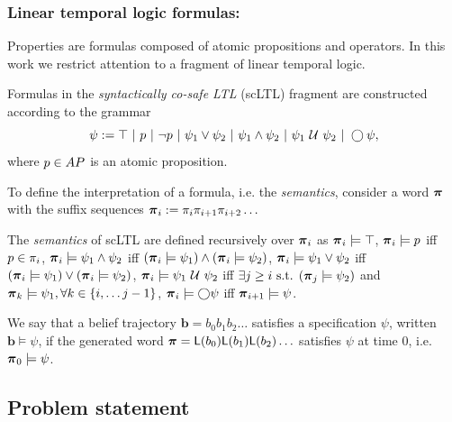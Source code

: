 \documentclass{ifacconf}
\begin{document}
\subsubsection{Linear temporal logic formulas:}

Properties are formulas composed of atomic propositions and operators. In this work we restrict attention to a fragment of linear temporal logic.
\begin{definition}
  \label{def:gdtl-syntax}
  Formulas in the \emph{syntactically co-safe LTL} (scLTL) fragment are constructed according to the grammar
  \begin{equation*}
    \label{eq:scLTL}
    \psi :=  \True \ |\ p \ |\ \notltl p \ |\ \psi_1 \vee\psi_2  \ |\ \psi_1 \andltl \psi_2 \ |\ \psi_1 \Until \psi_2 \ |\ \Next \psi,
  \end{equation*}
  where $p\in {AP}$ is an atomic proposition.
\end{definition}

To define the interpretation of a formula, i.e. the \emph{semantics}, consider a word ${\boldsymbol{\pi}}$ with the suffix sequences ${\boldsymbol{\pi}}_i:= \pi_i \pi_{i+1} \pi_{i+2} \ldots$

\begin{definition}
 The \emph{semantics} of scLTL are defined recursively  over ${\boldsymbol{\pi}}_i$ as
    ${\boldsymbol{\pi}}_i \models \top$,
    ${\boldsymbol{\pi}}_i \models p$ iff $p \in \pi_i$,
    ${\boldsymbol{\pi}}_i \models \psi_1 \wedge  \psi_2  $ iff $ ( {\boldsymbol{\pi}}_i \models \psi_1 ) \wedge ( {\boldsymbol{\pi}}_i \models \psi_2 ) $,
    ${\boldsymbol{\pi}}_i \models \psi_1 \vee  \psi_2  $ iff $ ( {\boldsymbol{\pi}}_i \models \psi_1 ) \vee ( {\boldsymbol{\pi}}_i \models \psi_2 ) $,
    ${\boldsymbol{\pi}}_i \models  \psi_1 \ \mathcal{U}\  \psi_2 $ iff $\exists j \geq i \text{ s.t. } ({\boldsymbol{\pi}}_j \models \psi_2 ) $ and ${\boldsymbol{\pi}}_k \models \psi_1, \forall k \in \{i, \ldots j-1\}$,
    ${\boldsymbol{\pi}}_i \models \bigcirc \psi$ iff ${\boldsymbol{\pi}}_{i+1} \models \psi$.
\end{definition}

We say that a belief trajectory $\mathbf{b} = b_0 b_1 b_2 \ldots$ satisfies a specification $\psi$, written $\mathbf{b} \models \psi$, if the generated word ${\boldsymbol{\pi}} =\mathsf{L}(b_0) \mathsf{L}(b_1) \mathsf{L}(b_2) \ldots$ satisfies $\psi$ at time 0, i.e. ${\boldsymbol{\pi}}_0 \models \psi$.


\subsection{Problem statement}
\end{document}
